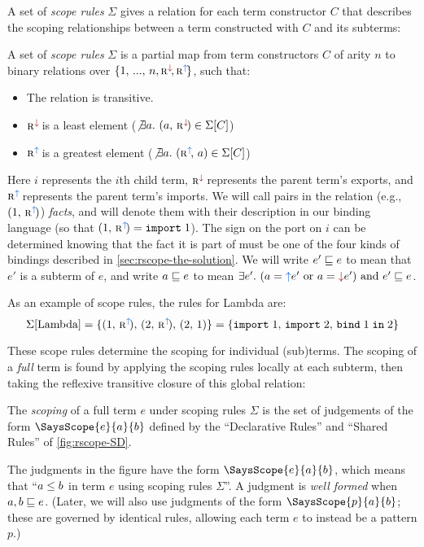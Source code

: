 A set of \emph{scope rules} $\Sigma$ gives a relation
for each term constructor $C$ that describes the scoping relationships
between a term constructed with $C$ and its subterms:
\begin{definition} \label{def:rscope-scope-rules}
  A set of \emph{scope rules} $\Sigma$ is a partial map from term
  constructors $C$ of arity $n$ to binary relations over
  $\{1,\,...,\,n,\Exp,\Imp\}$, such that:
  \begin{itemize}
  \item The relation is transitive.
  \item $\Exp$ is a least element ($\NotExists{a} (a,\,\Exp) \in \Sigma[C]$)
  \item $\Imp$ is a greatest element ($\NotExists{a} (\Imp,\,a) \in \Sigma[C]$)
  \end{itemize}
\end{definition}
Here $i$ represents the $i$th child term,
$\Exp$ represents the parent term's exports, and
$\Imp$ represents the parent term's imports.
We will call pairs in the relation (e.g., $(1,\,\Imp)$) \emph{facts},
and will denote them with their description in our binding
language (so that $(1,\,\Imp) = \SpecImpt{1}$).
The sign on the port on $i$ can be determined knowing that the fact it is part of must be
one of the four kinds of bindings described in \cref{sec:rscope-the-solution}.
We will write $e' \sqsubseteq e$ to mean that $e'$ is a subterm of $e$,
and write $a \sqsubseteq e$ to mean
$\Exists{e'} (a=\im{e'} \text{ or } a=\ex{e'}) \text{ and } e' \Subterm e$.

As an example of scope rules, the rules for Lambda are:
\[
\Sigma[\text{Lambda}] = \{(1,\,\Imp),\,(2,\,\Imp),\,(2,\,1)\} = \{\SpecImpt{1},\,\SpecImpt{2},\,\SpecBind{2}{1}\}
\]

These scope rules determine the scoping for individual (sub)terms.
The scoping of a \emph{full} term is found by applying the scoping rules
locally at each subterm, then taking the reflexive transitive closure
of this global relation:
\begin{definition}
The \emph{scoping} of a full term $e$ under scoping rules $\Sigma$
is the set of judgements of the form $\SaysScope{e}{a}{b}$
defined by the ``Declarative Rules'' and ``Shared Rules'' of 
\cref{fig:rscope-SD}.
\end{definition}

The judgments in the figure have the form
$\SaysScope{e}{a}{b}$, which means that
``$a \le b$ in term $e$ using scoping rules $\Sigma$''.
A judgment is \emph{well formed} when $a, b \sqsubseteq e$.
(Later, we will also use judgments of the form $\SaysScope{p}{a}{b}$; these
are governed by identical rules, allowing each term $e$ to instead be
a pattern $p$.)

